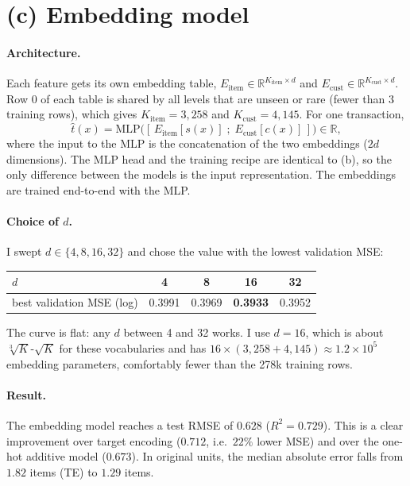 \documentclass[11pt]{article}
\newcommand{\R}{\mathbb{R}}
\begin{document}
\section*{(c) Embedding model}

\paragraph{Architecture.} Each feature gets its own embedding table,
$E_{\text{item}}\in\R^{K_{\text{item}}\times d}$ and $E_{\text{cust}}\in\R^{K_{\text{cust}}\times d}$.
Row 0 of each table is shared by all levels that are unseen or rare (fewer than 3 training rows),
which gives $K_{\text{item}}=3{,}258$ and $K_{\text{cust}}=4{,}145$. For one transaction,
\[
 \hat t(x)=\mathrm{MLP}\bigl([\,E_{\text{item}}[s(x)]\;;\;E_{\text{cust}}[c(x)]\,]\bigr)\in\R,
\]
where the input to the MLP is the concatenation of the two embeddings ($2d$ dimensions). The MLP
head and the training recipe are identical to (b), so the only difference between the models is
the input representation. The embeddings are trained end-to-end with the MLP.

\paragraph{Choice of $d$.} I swept $d\in\{4,8,16,32\}$ and chose the value with the lowest
validation MSE:

\begin{center}
\begin{tabular}{lcccc}
\toprule
$d$ & 4 & 8 & 16 & 32\\
\midrule
best validation MSE (log) & 0.3991 & 0.3969 & \textbf{0.3933} & 0.3952\\
\bottomrule
\end{tabular}
\end{center}
The curve is flat: any $d$ between 4 and 32 works. I use $d=16$, which is about
$\sqrt[3]{K}$-$\sqrt{K}$ for these vocabularies and has $16\times(3{,}258+4{,}145)\approx 1.2\times10^5$
embedding parameters, comfortably fewer than the 278k training rows.

\paragraph{Result.} The embedding model reaches a test RMSE of $0.628$ ($R^2=0.729$). This is a
clear improvement over target encoding ($0.712$, i.e.\ $22\%$ lower MSE) and over the one-hot
additive model ($0.673$). In original units, the median absolute error falls from $1.82$
items (TE) to $1.29$ items.
\end{document}
